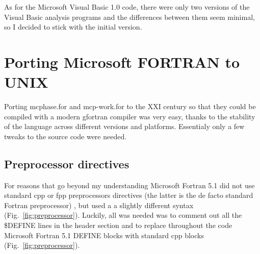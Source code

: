 As for the Microsoft Visual Basic 1.0 code, there were only two versions of the Visual Basic analysis programs and the differences between them seem minimal, so I decided to stick with the initial version.


\section{Porting Microsoft FORTRAN to UNIX}

Porting \textsf{mcphase.for} and \textsf{mcp-work.for} to the XXI century so that they could be compiled with a modern \textsf{gfortran} compiler was very easy, thanks to the stability of the language across different versions and platforms. Essentialy only a few tweaks to the source code were needed.


\subsection{Preprocessor directives}

For reasons that go beyond my understanding Microsoft Fortran 5.1 did not use standard \textsf{cpp} or \textsf{fpp} preprocessors directives (the latter is the de facto standard Fortran preprocessor) \cite{Boyanski:1992}, but used a a slightly different syntax (Fig.~\ref{fig:preprocessor}). Luckily, all was needed was to comment out all the \textsf{\$DEFINE} lines in the header section and to replace throughout the code Microsoft Fortran 5.1 \textsf{DEFINE} blocks with standard \textsf{cpp} blocks (Fig.~\ref{fig:preprocessor}). 


